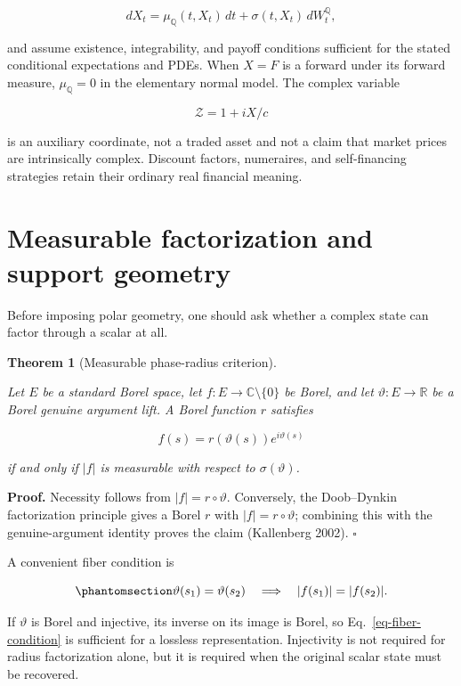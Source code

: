 \documentclass[
  english,
  10pt,
  letterpaper,
  DIV=11,
  numbers=noendperiod]{scrartcl}
\theoremstyle{definition}
\theoremstyle{plain}
\newtheorem{theorem}{Theorem}[section]
\theoremstyle{plain}
\theoremstyle{remark}
\begin{document}
\[
dX_t=\mu_{\mathbb Q}(t,X_t)\,dt+\sigma(t,X_t)\,dW_t^{\mathbb Q},
\]

and assume existence, integrability, and payoff conditions sufficient
for the stated conditional expectations and PDEs. When \(X=F\) is a
forward under its forward measure, \(\mu_{\mathbb Q}=0\) in the
elementary normal model. The complex variable

\[
\mathcal Z=1+iX/c
\]

is an auxiliary coordinate, not a traded asset and not a claim that
market prices are intrinsically complex. Discount factors, numeraires,
and self-financing strategies retain their ordinary real financial
meaning.

\section{Measurable factorization and support
geometry}\label{sec-factorization}

Before imposing polar geometry, one should ask whether a complex state
can factor through a scalar at all.

\begin{theorem}[Measurable phase-radius
criterion]\protect\hypertarget{thm-measurable-factorization}{}\label{thm-measurable-factorization}

Let \(E\) be a standard Borel space, let
\(f:E\to\mathbb C\setminus\{0\}\) be Borel, and let
\(\vartheta:E\to\mathbb R\) be a Borel genuine argument lift. A Borel
function \(r\) satisfies

\[
f(s)=r(\vartheta(s))e^{i\vartheta(s)}
\]

if and only if \(|f|\) is measurable with respect to
\(\sigma(\vartheta)\).

\end{theorem}

\textbf{Proof.} Necessity follows from \(|f|=r\circ\vartheta\).
Conversely, the Doob--Dynkin factorization principle gives a Borel \(r\)
with \(|f|=r\circ\vartheta\); combining this with the genuine-argument
identity proves the claim (Kallenberg 2002). \(\square\)

A convenient fiber condition is

\begin{equation}\protect\phantomsection\label{eq-fiber-condition}{
\vartheta(s_1)=\vartheta(s_2)
\quad\Longrightarrow\quad
|f(s_1)|=|f(s_2)|.
}\end{equation}

If \(\vartheta\) is Borel and injective, its inverse on its image is
Borel, so Eq.~\ref{eq-fiber-condition} is sufficient for a lossless
representation. Injectivity is not required for radius factorization
alone, but it is required when the original scalar state must be
recovered.
\end{document}
